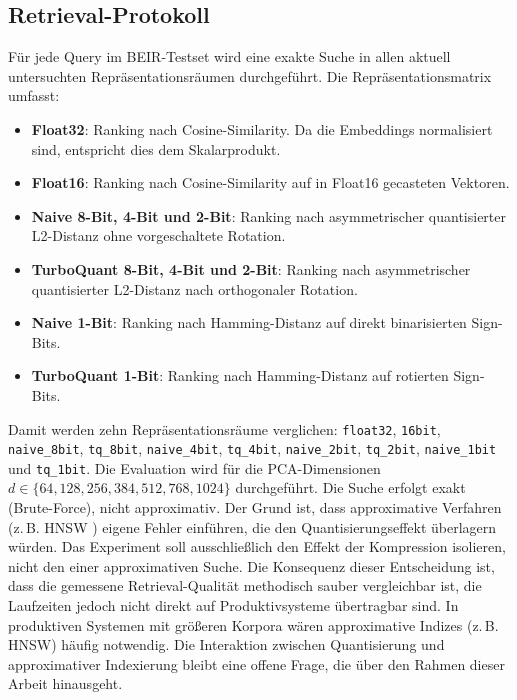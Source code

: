 \subsection{Retrieval-Protokoll}
%
Für jede Query im BEIR-Testset wird eine exakte Suche in allen aktuell untersuchten Repräsentationsräumen durchgeführt.
Die Repräsentationsmatrix umfasst:
\begin{itemize}
  \item \textbf{Float32}: Ranking nach Cosine-Similarity.
Da die Embeddings normalisiert sind, entspricht dies dem Skalarprodukt.
  \item \textbf{Float16}: Ranking nach Cosine-Similarity auf in Float16 gecasteten Vektoren.
  \item \textbf{Naive 8-Bit, 4-Bit und 2-Bit}: Ranking nach asymmetrischer quantisierter L2-Distanz ohne vorgeschaltete Rotation.
  \item \textbf{TurboQuant 8-Bit, 4-Bit und 2-Bit}: Ranking nach asymmetrischer quantisierter L2-Distanz nach orthogonaler Rotation.
  \item \textbf{Naive 1-Bit}: Ranking nach Hamming-Distanz auf direkt binarisierten Sign-Bits.
  \item \textbf{TurboQuant 1-Bit}: Ranking nach Hamming-Distanz auf rotierten Sign-Bits.
\end{itemize}
%
Damit werden zehn Repräsentationsräume verglichen: \texttt{float32}, \texttt{16bit}, \texttt{naive\_8bit}, \texttt{tq\_8bit}, \texttt{naive\_4bit}, \texttt{tq\_4bit}, \texttt{naive\_2bit}, \texttt{tq\_2bit}, \texttt{naive\_1bit} und \texttt{tq\_1bit}.
Die Evaluation wird für die PCA-Dimensionen $d \in \{64, 128, 256, 384, 512, 768, 1024\}$ durchgeführt.
%
Die Suche erfolgt exakt (Brute-Force), nicht approximativ.
Der Grund ist, dass approximative Verfahren (z.\,B.
HNSW \cite{malkov_2020_hnsw}) eigene Fehler einführen, die den Quantisierungseffekt überlagern würden.
Das Experiment soll ausschließlich den Effekt der Kompression isolieren, nicht den einer approximativen Suche.
Die Konsequenz dieser Entscheidung ist, dass die gemessene Retrieval-Qualität methodisch sauber vergleichbar ist, die Laufzeiten jedoch nicht direkt auf Produktivsysteme übertragbar sind.
In produktiven Systemen mit größeren Korpora wären approximative Indizes (z.\,B.
HNSW) häufig notwendig.
Die Interaktion zwischen Quantisierung und approximativer Indexierung bleibt eine offene Frage, die über den Rahmen dieser Arbeit hinausgeht.
%
